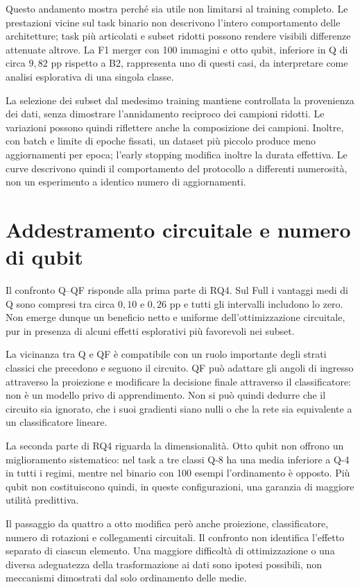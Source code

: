 Questo andamento mostra perché sia utile non limitarsi al training
completo. Le prestazioni vicine sul task binario non descrivono
l'intero comportamento delle architetture; task più articolati e
subset ridotti possono rendere visibili differenze attenuate altrove.
La F1 merger con 100 immagini e otto qubit, inferiore in Q di circa
\(9{,}82\) pp rispetto a B2, rappresenta uno di questi casi,
da interpretare come analisi esplorativa di una singola classe.

La selezione dei subset dal medesimo training mantiene controllata
la provenienza dei dati, senza dimostrare l'annidamento reciproco
dei campioni ridotti. Le variazioni possono quindi riflettere anche
la composizione dei campioni. Inoltre, con batch e limite di epoche
fissati, un dataset più piccolo produce meno aggiornamenti per epoca;
l'early stopping modifica inoltre la durata effettiva. Le curve
descrivono quindi il comportamento del protocollo a differenti
numerosità, non un esperimento a identico numero di aggiornamenti.

\section{Addestramento circuitale e numero di qubit}
\label{sec:disc-rq4}

Il confronto Q--QF risponde alla prima parte di RQ4. Sul Full i
vantaggi medi di Q sono compresi tra circa \(0{,}10\) e \(0{,}26\)
pp e tutti gli intervalli includono lo zero. Non emerge dunque un
beneficio netto e uniforme dell'ottimizzazione circuitale, pur in
presenza di alcuni effetti esplorativi più favorevoli nei subset.

La vicinanza tra Q e QF è compatibile con un ruolo importante degli
strati classici che precedono e seguono il circuito. QF può adattare
gli angoli di ingresso attraverso la proiezione e modificare la
decisione finale attraverso il classificatore: non è un modello
privo di apprendimento. Non si può quindi dedurre che il circuito
sia ignorato, che i suoi gradienti siano nulli o che la rete sia
equivalente a un classificatore lineare.

La seconda parte di RQ4 riguarda la dimensionalità. Otto qubit non
offrono un miglioramento sistematico: nel task a tre classi Q-8
ha una media inferiore a Q-4 in tutti i regimi, mentre nel binario
con 100 esempi l'ordinamento è opposto. Più qubit non costituiscono
quindi, in queste configurazioni, una garanzia di maggiore utilità
predittiva.

Il passaggio da quattro a otto modifica però anche proiezione,
classificatore, numero di rotazioni e collegamenti circuitali.
Il confronto non identifica l'effetto separato di ciascun elemento.
Una maggiore difficoltà di ottimizzazione o una diversa adeguatezza
della trasformazione ai dati sono ipotesi possibili, non meccanismi
dimostrati dal solo ordinamento delle medie.

